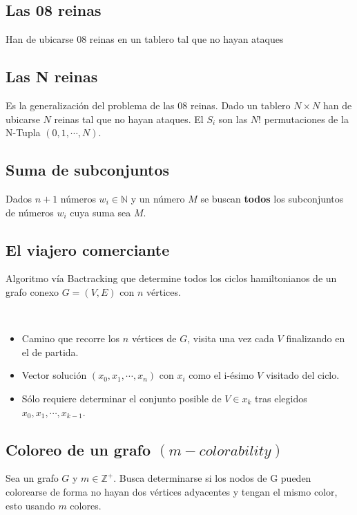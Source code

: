 \documentclass[tikz,11pt,fleqn]{book} %
\begin{document}

\subsection{Las 08 reinas}
    Han de ubicarse 08 reinas en un tablero tal que no hayan ataques


\subsection{Las N reinas}
    Es la generalización del problema de las 08 reinas. Dado un tablero $N\times N$ han de ubicarse $N$ reinas tal que no hayan ataques.
    El $S_i$ son las $N!$ permutaciones de la N-Tupla $(0,1, \cdots,N)$.

\subsection{Suma de subconjuntos}
    Dados $n+1$ números $w_i\in\mathbb N$ y un número $M$ se buscan \textbf{todos} los subconjuntos de números $w_i$ cuya suma sea $M$.


\subsection{El viajero comerciante}

    Algoritmo vía Bactracking que determine todos los ciclos hamiltonianos de un grafo conexo $G=(V,E)$ con $n$ vértices.
    
    \begin{definition}~
        \begin{itemize}
            \item Camino que recorre los $n$ vértices de $G$, visita una vez cada $V$ finalizando en el de partida.
            \item Vector solución $(x_0,x_1,\cdots,x_n)$ con $x_i$ como el i-ésimo $V$ visitado del ciclo.
            \item Sólo requiere determinar el conjunto posible de $V\in x_k$ tras elegidos $x_0,x_1,\cdots,x_{k-1}$. 
        \end{itemize}
            
    \end{definition}
    

\subsection{Coloreo de un grafo $(m-colorability)$}
    Sea un grafo $G$ y $m\in\mathbb Z^+$.
    Busca determinarse si los nodos de G pueden colorearse de forma no hayan dos vértices adyacentes y tengan el mismo color, esto usando $m$ colores.
\end{document}

